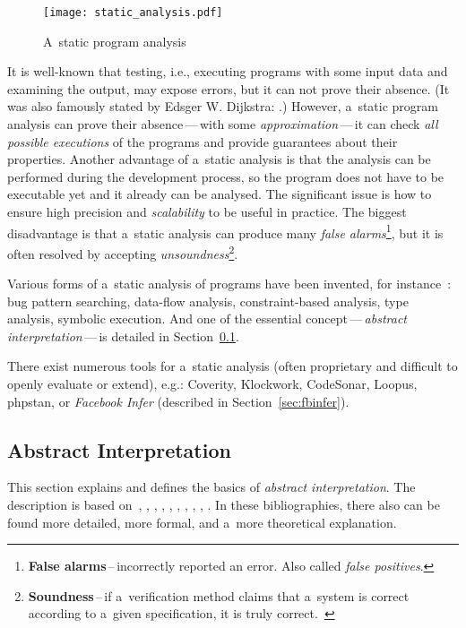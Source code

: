 \begin{figure}[hbt]
    \centering
    \texttt{[image: static\_analysis.pdf]}
    \caption{%
        A~static program analysis~\cite{AIBasedFormalMethodsCousot}
    }
    \label{fig:staticAnalysis}
\end{figure}

It is well-known that testing, i.e., executing programs
with some input data and examining the output, may expose errors, but it
can not prove their absence. (It was also famously stated by Edsger W.
Dijkstra: .) However, a~static program analysis
can prove their absence\,---\,with some \emph{approximation}\,---\,it can
check \emph{all possible executions} of the programs and provide guarantees
about their properties. Another advantage of a~static analysis is that the
analysis can be performed during the development process, so the program
does not have to be executable yet and it already can be analysed.
The significant issue is how to ensure high precision and
\emph{scalability} to be useful in practice. The biggest disadvantage is
that a~static analysis can produce many \emph{false alarms}\footnote{%
\textbf{False alarms}\,--\,incorrectly reported an error. Also called
\emph{false positives}.}, but it is often
resolved by accepting \emph{unsoundness}\footnote{\textbf{Soundness}\,--\,if
a~verification method claims that a~system is correct according to a~given
specification, it is truly correct.~\cite{favStaticAnalysis}}.

Various forms of a~static analysis of programs have been invented, for
instance~\cite{favStaticAnalysis}: bug pattern searching, data-flow
analysis, constraint-based analysis, type analysis, symbolic execution. And
one of the essential concept\,---\,\emph{abstract interpretation}\,---\,is
detailed in Section~\ref{sec:AI}.

There exist numerous tools for a~static analysis (often proprietary and
difficult to openly evaluate or extend), e.g.: Coverity, Klockwork, CodeSonar,
Loopus, phpstan, or \emph{Facebook Infer} (described in
Section~\ref{sec:fbinfer}).


\subsection{Abstract Interpretation}
\label{sec:AI}

This section explains and defines the basics of \emph{abstract interpretation}.
The description is based on~\cite{AIBasedFormalMethodsCousot},
\cite{AILatticeModelCousot}, \cite{AIInNutshellCousot}, \cite{AICousotWeb},
\cite{favAI}, \cite{projectPracticeMarcin2018}, \cite{wideningNarrowingCousot},
\cite{programAnalysisNielson}, \cite{staticAnalysisMoller},
\cite{favLatticesAndFixpoints}. In these bibliographies, there also can be
found more detailed, more formal, and a~more theoretical explanation.

